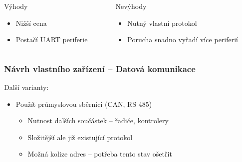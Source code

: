 \documentclass[%
  12pt,       				%
	t,                  %
	aspectratio=1610,   %
	unicode,						%
]{beamer}				    	%
\begin{document}
\begin{frame}[fragile]
		\begin{columns}[T] 								%
		\begin{column}{0.5\textwidth}		%
			\begin{block}{Výhody}
				\begin{itemize}
					\item Nižší cena \\
					\item Postačí UART periferie
				\end{itemize}
			\end{block}
		\end{column}
		\begin{column}{0.5\textwidth}		%
			\begin{alertblock}{Nevýhody}
				\begin{itemize}
					\item Nutný vlastní protokol \\
					\item Porucha snadno vyřadí více periferií
				\end{itemize}
			\end{alertblock}
		\end{column}
	\end{columns}											%
\end{frame}

\begin{frame}[fragile]
	\frametitle{Návrh vlastního zařízení -- Datová komunikace}
	Další varianty:\\[1ex]
	\begin{itemize}
		\item Použít průmyslovou sběrnici (CAN, RS 485)
		\begin{itemize}
			\item Nutnost dalších součástek -- řadiče, kontrolery
			\item Složitější ale již existující protokol
			\item Možná kolize adres -- potřeba tento stav ošetřit
		\end{itemize}
	\end{itemize}
\end{frame}
\end{document}
